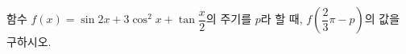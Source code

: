 함수 $f(x)=\sin 2x+3\cos^2 x+\tan\dfrac{x}{2}$의 주기를 $p$라 할 때, $f\left(\dfrac{2}{3}\pi-p\right)$의 값을 구하시오.
